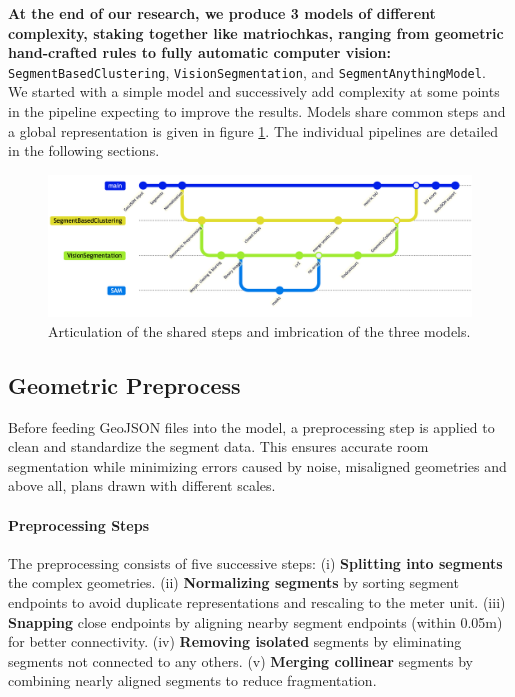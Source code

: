 \documentclass[11pt]{article}
\begin{document}
\textbf{At the end of our research, we produce 3 models of different complexity,
staking together like matriochkas, 
ranging from geometric hand-crafted rules to fully automatic computer vision:}
\texttt{SegmentBasedClustering}, 
\texttt{VisionSegmentation}, 
and \texttt{SegmentAnythingModel}.\\ We started with a simple model and successively add 
complexity at some points in the pipeline expecting to improve the results. 
Models share common steps and a global representation
is given in figure \ref{fig:global_pipeline}. The individual pipelines are detailed 
in the following sections.
\begin{figure}[h]
    \centering
    \includegraphics[width=01\linewidth]{figures/CapstoneGit.png}
    \caption{Articulation of the shared steps and imbrication of the three models.}
    \label{fig:global_pipeline}
\end{figure}

\subsection{Geometric Preprocess}
\label{sec:geometric_preprocess}

Before feeding GeoJSON files into the model, a preprocessing step is applied to 
clean and standardize the segment data. This ensures accurate room segmentation 
while minimizing errors caused by noise, misaligned geometries and above all,
plans drawn with different scales.

\paragraph{Preprocessing Steps}
The preprocessing consists of five successive steps:
(i) \textbf{Splitting into segments} the complex geometries.
(ii) \textbf{Normalizing segments} by sorting segment endpoints to avoid duplicate representations and rescaling to the meter unit.
(iii) \textbf{Snapping} close endpoints by aligning nearby segment endpoints (within 0.05m) for better connectivity.
(iv) \textbf{Removing isolated} segments by eliminating segments not connected to any others.
(v) \textbf{Merging collinear} segments by combining nearly aligned segments to reduce fragmentation.
\end{document}
